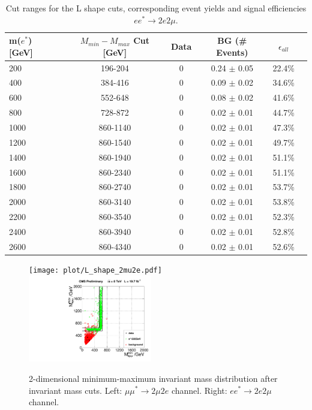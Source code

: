 \begin{table}[h!]
\begin{center}
\begin{tabular}{|l|c|c|c|c|c|}
\hline
m($e^{*}$) [GeV] & $M_{min}-M_{max}$ Cut [GeV] & Data & BG (\# Events) & $\epsilon_{all}$ \\
\hline
\hline
200 & 196-204 & 0 & 0.24 $\pm$ 0.05 & 22.4\% \\
400 & 384-416 & 0 & 0.09 $\pm$ 0.02 & 34.6\% \\
600 & 552-648 & 0 & 0.08 $\pm$ 0.02 & 41.6\% \\
800 & 728-872 & 0 & 0.02 $\pm$ 0.01 & 44.7\% \\
1000 & 860-1140 & 0 & 0.02 $\pm$ 0.01 & 47.3\% \\
1200 & 860-1540 & 0 & 0.02 $\pm$ 0.01 & 49.7\% \\
1400 & 860-1940 & 0 & 0.02 $\pm$ 0.01 & 51.1\% \\
1600 & 860-2340 & 0 & 0.02 $\pm$ 0.01 & 51.1\% \\
1800 & 860-2740 & 0 & 0.02 $\pm$ 0.01 & 53.7\% \\
2000 & 860-3140 & 0 & 0.02 $\pm$ 0.01 & 53.8\% \\
2200 & 860-3540 & 0 & 0.02 $\pm$ 0.01 & 52.3\% \\
2400 & 860-3940 & 0 & 0.02 $\pm$ 0.01 & 52.8\% \\
2600 & 860-4340 & 0 & 0.02 $\pm$ 0.01 & 52.6\% \\
\hline
\end{tabular}
\caption{\label{tab:LShape4}Cut ranges for the L shape cuts, corresponding event yields and signal efficiencies $e e^{*} \rightarrow 2e 2\mu$.}
\end{center}
\end{table} 


\begin{figure}[hp]
\begin{center}
\texttt{[image: plot/L\_shape\_2mu2e.pdf]} 
\includegraphics[width=0.48\textwidth]{plot/L_shape_2e2mu.pdf}
\end{center}
\caption{\label{fig:Boundaries}2-dimensional minimum-maximum invariant mass distribution after invariant mass cuts. Left: $\mu\mu^{*} \rightarrow 2\mu 2e$ channel. Right: $ee^{*}\rightarrow 2e2\mu$ channel.}
\end{figure}


